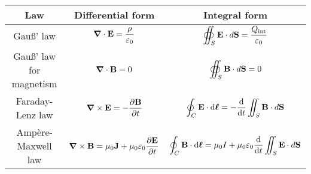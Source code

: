 \documentclass[../../../main.tex]{subfiles}
\begin{document}
\begin{table}[ht]
  \centering
  \renewcommand{\arraystretch}{2.5}
  \begin{tabular}{|c|c|c|}
    \hline
    \bfseries Law             & \bfseries Differential form                                                                                                                            & \bfseries Integral form                                                                                                                           \\
    \hline
    Gau\ss' law               & $\displaystyle \boldsymbol{\mathrm{\grad}}\cdot\boldsymbol{\mathrm{E}}=\frac{\rho}{\varepsilon_0}$                                                               & $\displaystyle \oiint_S\boldsymbol{\mathrm{E}}\cdot d\boldsymbol{\mathrm{S}}=\frac{Q_{\text{int}}}{\varepsilon_0}$                                          \\
    \hline
    Gau\ss' law for magnetism & $\displaystyle \boldsymbol{\mathrm{\grad}}\cdot\boldsymbol{\mathrm{B}}=0$                                                                                        & $\displaystyle \oiint_S\boldsymbol{\mathrm{B}}\cdot d\boldsymbol{\mathrm{S}}=0$                                                                             \\
    \hline
    Faraday-Lenz law          & $\displaystyle \boldsymbol{\mathrm{\grad}}\times\boldsymbol{\mathrm{E}}=-\frac{\partial\boldsymbol{\mathrm{B}}}{\partial t}$                                          & $\displaystyle \oint_C\boldsymbol{\mathrm{E}}\cdot \dd\vb*{\ell}=-\dv{}{t}\iint_S\boldsymbol{\mathrm{B}}\cdot d\boldsymbol{\mathrm{S}}$                          \\
    \hline
    Ampère-Maxwell law        & $\displaystyle \boldsymbol{\mathrm{\grad}}\times\boldsymbol{\mathrm{B}}=\mu_0\boldsymbol{\mathrm{J}}+\mu_0\varepsilon_0\frac{\partial\boldsymbol{\mathrm{E}}}{\partial t}$ & $\displaystyle \oint_C\boldsymbol{\mathrm{B}}\cdot \dd\vb*{\ell}=\mu_0 I+\mu_0\varepsilon_0\dv{}{t}\iint_S\boldsymbol{\mathrm{E}}\cdot d\boldsymbol{\mathrm{S}}$ \\
    \hline
  \end{tabular}
\end{table}
\end{document}
